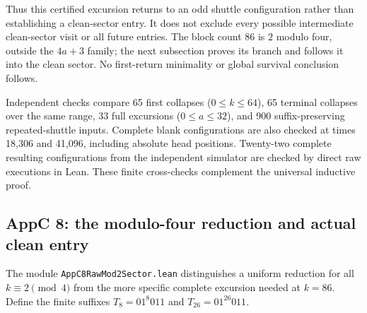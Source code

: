 \documentclass[11pt]{article}
\DeclareRobustCommand{\_}{\ifmmode\sb\else\textunderscore\allowbreak\fi}
\theoremstyle{definition}
\theoremstyle{remark}
\begin{document}
Thus this certified excursion returns to an odd shuttle configuration rather than establishing a clean-sector entry. It does not exclude every possible intermediate clean-sector visit or all future entries. The block count 86 is $2$ modulo four, outside the $4a+3$ family; the next subsection proves its branch and follows it into the clean sector. No first-return minimality or global survival conclusion follows.

Independent checks compare 65 first collapses ($0\le k\le64$), 65 terminal collapses over the same range, 33 full excursions ($0\le a\le32$), and 900 suffix-preserving repeated-shuttle inputs. Complete blank configurations are also checked at times 18,306 and 41,096, including absolute head positions. Twenty-two complete resulting configurations from the independent simulator are checked by direct raw executions in Lean. These finite cross-checks complement the universal inductive proof.

\subsection{AppC 8: the modulo-four reduction and actual clean entry}
\label{sec:appc8mod2}
The module \texttt{AppC8RawMod2Sector.lean} distinguishes a uniform reduction for all $k\equiv2\pmod4$ from the more specific complete excursion needed at $k=86$. Define the finite suffixes $T_8=01^8 011$ and $T_{26}=01^{26}011$.
\end{document}
